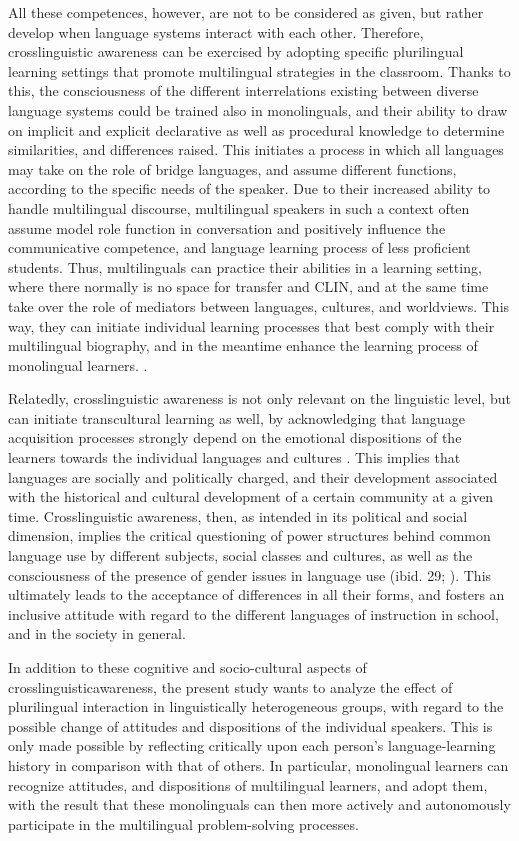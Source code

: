 \documentclass[output=paper]{../langscibook}
\begin{document}
All these competences, however, are not to be considered as given, but rather develop when language systems interact with each other. Therefore, crosslinguistic awareness can be exercised by adopting specific plurilingual learning settings that promote multilingual strategies in the classroom. Thanks to this, the consciousness of the different interrelations existing between diverse language systems could be trained also in monolinguals, and their ability to draw on implicit and explicit declarative as well as procedural knowledge to determine similarities, and differences raised. This initiates a process in which all languages may take on the role of bridge languages, and assume different functions, according to the specific needs of the speaker. Due to their increased ability to handle multilingual discourse, multilingual speakers in such a context often assume model role function in conversation and positively influence the communicative competence, and language learning process of less proficient students. Thus, multilinguals can practice their abilities in a learning setting, where there normally is no space for transfer and CLIN, and at the same time take over the role of mediators between languages, cultures, and worldviews. This way, they can initiate individual learning processes that best comply with their multilingual biography, and in the meantime enhance the learning process of monolingual learners. \citep{Jessner2006}.

Relatedly, crosslinguistic awareness is not only relevant on the linguistic level, but can initiate transcultural learning as well, by acknowledging that language acquisition processes strongly depend on the emotional dispositions of the learners towards the individual languages and cultures \citep[29]{Burwitz-Melzer2012}. This implies that languages are socially and politically charged, and their development associated with the historical and cultural development of a certain community at a given time. Crosslinguistic awareness, then, as intended in its political and social dimension, implies the critical questioning of power structures behind common language use by different subjects, social classes and cultures, as well as the consciousness of the presence of gender issues in language use (ibid. 29; \citealt[28f]{Morkotter2005}). This ultimately leads to the acceptance of differences in all their forms, and fosters an inclusive attitude with regard to the different languages of instruction in school, and in the society in general. 

In addition to these cognitive and socio-cultural aspects of crosslinguistic\linebreak awareness, the present study wants to analyze the effect of plurilingual interaction in linguistically heterogeneous groups, with regard to the possible change of attitudes and dispositions of the individual speakers. This is only made possible by reflecting critically upon each person’s language-learning history in comparison with that of others. In particular, monolingual learners can recognize attitudes, and dispositions of multilingual learners, and adopt them, with the result that these monolinguals can then more actively and autonomously participate in the multilingual problem-solving processes. 
\end{document}
